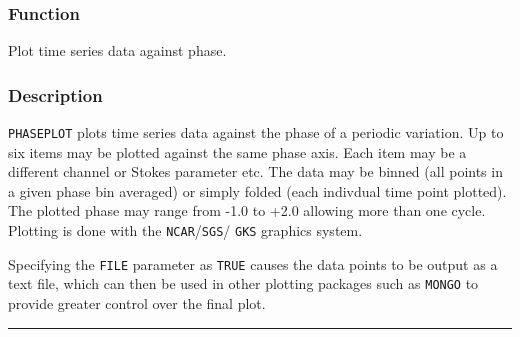 \documentclass[11pt,twoside,nolof,noabs]{starlink}
\newenvironment{manroutinedescription}{}{\par{}\rule{\textwidth}{0.5mm}}
\newcommand{\manroutineitem}[2]{\subsubsection*{#1}#2\par{}}
\providecommand{\mantt}[1]{\texttt{#1}}
\begin{document}
\begin{manroutinedescription}
\manroutineitem{Function}{}
        Plot time series data against phase.

\manroutineitem{Description}{}
        {\mantt{PHASEPLOT}} plots time series data against the phase of a %
periodic
        variation. Up to six items may be plotted against the same phase
        axis. Each item may be a different channel or Stokes parameter etc.
        The data may be binned (all points in a given phase bin averaged)
        or simply folded (each indivdual time point plotted). The
        plotted phase may range from -1.0 to +2.0 allowing more than
        one cycle. Plotting is done with the {\mantt{NCAR}}/{\mantt{SGS}}/{%
\mantt{GKS}} graphics system.

        Specifying the {\mantt{FILE}} parameter as {\mantt{TRUE}} causes the %
data points
        to be output as a text file, which can then be used in other
        plotting packages such as {\mantt{MONGO}} to provide greater control %
over
        the final plot.


\end{manroutinedescription}
\end{document}
